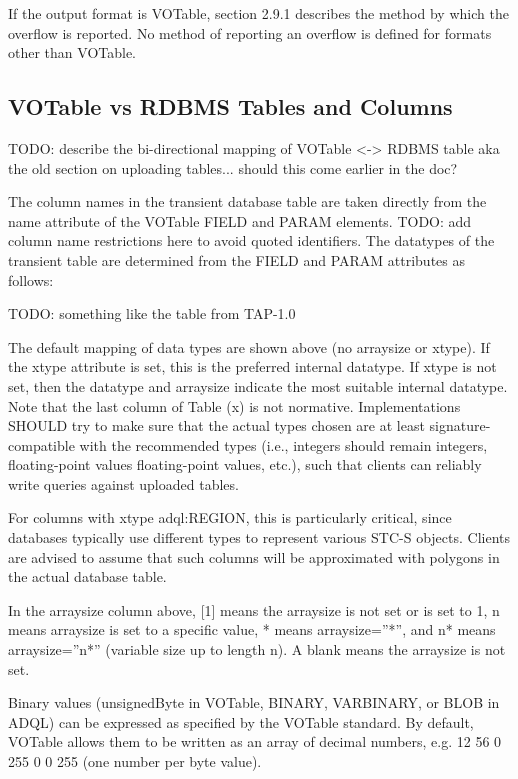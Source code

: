 \documentclass[11pt,a4paper]{ivoa}
\begin{document}
{If the output format is VOTable, section 2.9.1 describes the method by which 
the overflow is reported. No method of reporting an overflow is defined for 
formats other than VOTable.

\subsection{VOTable vs RDBMS Tables and Columns}

TODO: describe the bi-directional mapping of VOTable <-> RDBMS table aka the 
old section on uploading tables... should this come earlier in the doc?

The column names in the transient database table are taken directly from the 
name attribute of the VOTable FIELD and PARAM elements. TODO: add column name 
restrictions here to avoid quoted identifiers. The datatypes of the 
transient table are determined from the FIELD and PARAM attributes as follows:

TODO: something like the table from TAP-1.0

The default mapping of data types are shown above (no arraysize or xtype). If 
the xtype attribute is set, this is the preferred internal datatype. If xtype is 
not set, then the datatype and arraysize indicate the most suitable internal 
datatype. Note that the last column of Table (x) is not normative. 
Implementations SHOULD try to make sure that the actual types chosen are at 
least signature-compatible with the recommended types (i.e., integers should 
remain integers, floating-point values floating-point values, etc.), such that 
clients can reliably write queries against uploaded tables.

For columns with xtype adql:REGION, this is particularly critical, since 
databases typically use different types to represent various STC-S objects. 
Clients are advised to assume that such columns will be approximated with 
polygons in the actual database table.

In the arraysize column above, [1] means the arraysize is not set or is set to 
1, n means arraysize is set to a specific value, * means arraysize=”*”, and n* 
means arraysize=”n*” (variable size up to length n). A blank means the arraysize 
is not set.

Binary values (unsignedByte in VOTable, BINARY, VARBINARY, or BLOB in ADQL) can 
be expressed as specified by the VOTable standard. By default, VOTable allows 
them to be written as an array of decimal numbers, e.g. 12 56 0 255 0 0 255 (one 
number per byte value).

}
\end{document}
